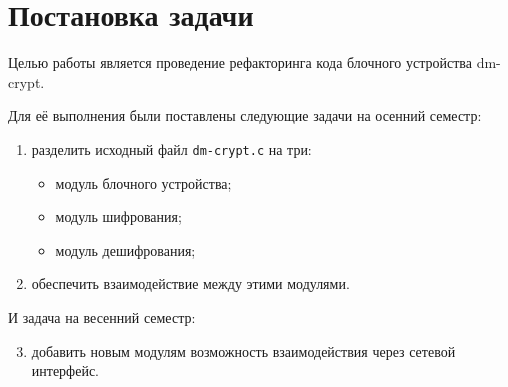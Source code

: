 
\section{Постановка задачи}
\label{sec:task}

Целью работы является проведение рефакторинга кода блочного устройства dm-crypt.

Для её выполнения были поставлены следующие задачи на осенний семестр:
\begin{enumerate}
    \item разделить исходный файл \texttt{dm-crypt.c} на три:
          \begin{itemize}
              \item{} модуль блочного устройства;
              \item{} модуль шифрования;
              \item{} модуль дешифрования;
          \end{itemize}
    \item обеспечить взаимодействие между этими модулями.
\end{enumerate}

\noindent И задача на весенний семестр:
\begin{enumerate}
    \setcounter{enumi}{2}
    \item добавить новым модулям возможность взаимодействия через сетевой интерфейс.
\end{enumerate}
